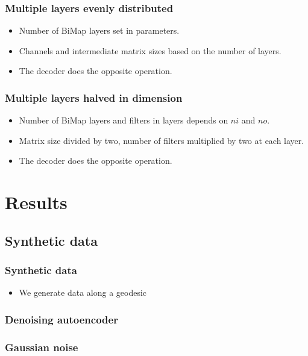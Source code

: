 \documentclass{beamer}
\begin{document}
\begin{frame}
\frametitle{Multiple layers evenly distributed}
\begin{itemize}
    \item Number of BiMap layers set in parameters.
    \item Channels and intermediate matrix sizes based on the number of layers.
    \item The decoder does the opposite operation.
\end{itemize}
\begin{center}
    {\tiny
    
    }
\end{center}
\end{frame}

\begin{frame}
\frametitle{Multiple layers halved in dimension}
\begin{itemize}
    \item Number of BiMap layers and filters in layers depends on $ni$ and $no$.
    \item Matrix size divided by two, number of filters multiplied by two at each layer.
    \item The decoder does the opposite operation.
\end{itemize}
\begin{center}
    {\tiny
    
    }
\end{center}

\end{frame}

\section{Results}

\subsection{Synthetic data}
\begin{frame}
\frametitle{Synthetic data}
\begin{itemize}
    \item We generate data along a geodesic
\end{itemize}
\end{frame}

\begin{frame}
    \frametitle{Denoising autoencoder}
    
\end{frame}
\begin{frame}
    \frametitle{Gaussian noise}
    
\end{frame}
\end{document}
